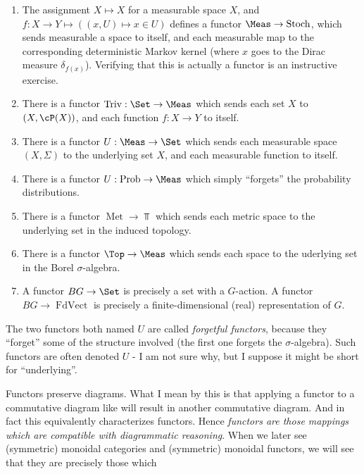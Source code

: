 \documentclass{article}
\DeclareMathOperator{\Met}{Met}
\DeclareMathOperator{\FdVect}{FdVect}
\DeclareMathOperator{\Stoch}{Stoch}
\DeclareMathOperator{\Prob}{Prob}
\DeclareMathOperator{\Triv}{Triv}
\begin{document}
\begin{example}
    \begin{enumerate}
    \item The assignment $X \mapsto X$ for a measurable space $X$, and $f: X \to Y \mapsto ((x,U) \mapsto x \in U)$ defines a functor $\Meas \to \Stoch$,
    which sends measurable a space to itself, and each measurable map to the corresponding deterministic Markov kernel (where $x$ goes to the Dirac measure $\delta_{f(x)}$).
    Verifying that this is actually a functor is an instructive exercise.
    \item There is a functor $\Triv: \Set \to \Meas$ which sends each set $X$ to $(X,\cP(X))$, and each function $f: X \to Y$ to itself.
    \item There is a functor $U: \Meas \to \Set$ which sends each measurable space $(X,\Sigma)$ to the underlying set $X$, and each measurable function to itself.
    \item There is a functor $U: \Prob \to \Meas$ which simply ``forgets'' the probability distributions.
    \item There is a functor $\Met \to \Top$ which sends each metric space to the underlying set in the induced topology.
    \item There is a functor $\Top \to \Meas$ which sends each space to the uderlying set in the Borel $\sigma$-algebra.
    \item A functor $BG \to \Set$ is precisely a set with a $G$-action. A functor $BG \to \FdVect$ is precisely a finite-dimensional (real) representation of $G$.
    \end{enumerate}
\end{example}
The two functors both named $U$ are called \emph{forgetful functors}, because they ``forget'' some of the structure involved (the first one forgets the $\sigma$-algebra).
Such functors are often denoted $U$ - I am not sure why, but I suppose it might be short for ``underlying''.

Functors preserve diagrams. What I mean by this is that applying a functor to a commutative diagram like  will result in another commutative diagram.
And in fact this equivalently characterizes functors.
Hence \emph{functors are those mappings which are compatible with diagrammatic reasoning}.
When we later see (symmetric) monoidal categories and (symmetric) monoidal functors, we will see that they are precisely those which 
\end{document}
